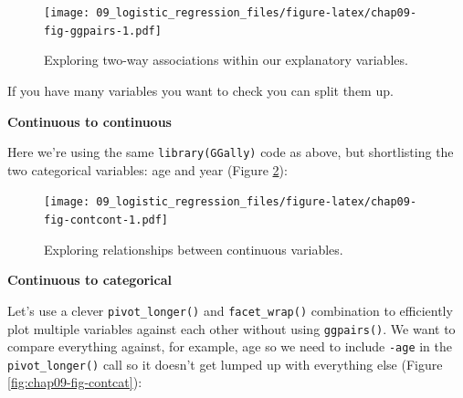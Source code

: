 \documentclass[
  12pt,
  krantz2]{krantz}
\makeatletter
\newenvironment{Shaded}{\begin{snugshade}}{\end{snugshade}}
\newcommand{\DataTypeTok}[1]{\textcolor[rgb]{0.13,0.29,0.53}{#1}}
\newcommand{\KeywordTok}[1]{\textcolor[rgb]{0.13,0.29,0.53}{\textbf{#1}}}
\newcommand{\NormalTok}[1]{#1}
\newcommand{\OperatorTok}[1]{\textcolor[rgb]{0.81,0.36,0.00}{\textbf{#1}}}
\newcommand{\StringTok}[1]{\textcolor[rgb]{0.31,0.60,0.02}{#1}}
\newenvironment{kframe}{%
\medskip{}
\setlength{\fboxsep}{.8em}
 \def\at@end@of@kframe{}%
 \ifinner\ifhmode%
  \def\at@end@of@kframe{\end{minipage}}%
  \begin{minipage}{\columnwidth}%
 \fi\fi%
 \def\FrameCommand##1{\hskip\@totalleftmargin \hskip-\fboxsep
 \colorbox{shadecolor}{##1}\hskip-\fboxsep
     \hskip-\linewidth \hskip-\@totalleftmargin \hskip\columnwidth}%
 \MakeFramed {\advance\hsize-\width
   \@totalleftmargin\z@ \linewidth\hsize
   \@setminipage}}%
 {\par\unskip\endMakeFramed%
 \at@end@of@kframe}
\renewenvironment{Shaded}{\begin{kframe}}{\end{kframe}}
\makeatother
\begin{document}
\begin{figure}
\centering
\texttt{[image: 09\_logistic\_regression\_files/figure-latex/chap09-fig-ggpairs-1.pdf]}
\caption{\label{fig:chap09-fig-ggpairs}Exploring two-way associations within our explanatory variables.}
\end{figure}


If you have many variables you want to check you can split them up.

\textbf{Continuous to continuous}

Here we're using the same \texttt{library(GGally)} code as above, but shortlisting the two categorical variables: age and year (Figure \ref{fig:chap09-fig-contcont}):

\begin{Shaded}
\end{Shaded}

\begin{figure}
\centering
\texttt{[image: 09\_logistic\_regression\_files/figure-latex/chap09-fig-contcont-1.pdf]}
\caption{\label{fig:chap09-fig-contcont}Exploring relationships between continuous variables.}
\end{figure}

\textbf{Continuous to categorical}

Let's use a clever \texttt{pivot\_longer()} and \texttt{facet\_wrap()} combination to efficiently plot multiple variables against each other without using \texttt{ggpairs()}.
We want to compare everything against, for example, age so we need to include \texttt{-age} in the \texttt{pivot\_longer()} call so it doesn't get lumped up with everything else (Figure \ref{fig:chap09-fig-contcat}):
\end{document}

